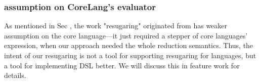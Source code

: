 \subsubsection{assumption on CoreLang's evaluator}
\label{mark:assumption} As mentioned in Sec , the work "resugaring" originated from has weaker assumption on the core language---it just required a stepper of core languages' expression, when our approach needed the whole reduction semantics. Thus, the intent of our resugaring is not a tool for supporting resugaring for languages, but a tool for implementing DSL better. We will discuss this in feature work for details. 